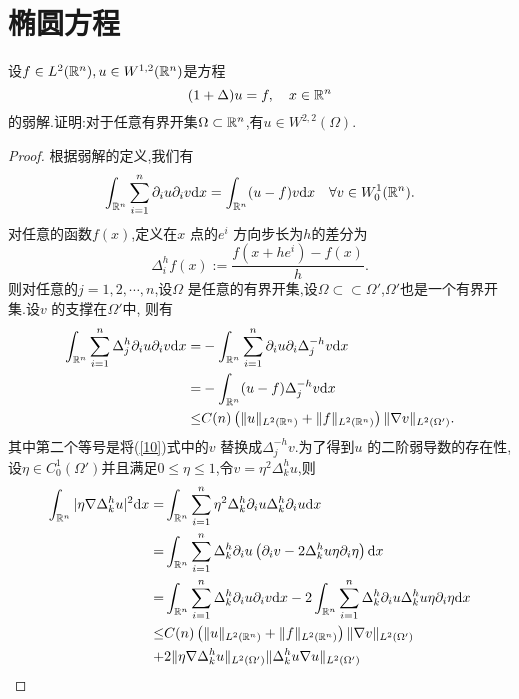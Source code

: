 \section{椭圆方程}
\begin{exercise}
  设$f\in  L^2(\mathbb{R}^{n}),u\in W^{1,2}(\mathbb{R}^{n})$是方程
  \[
    (1+\Delta)u=f,\quad x\in \mathbb{R}^{n}
  \] 
  的弱解.证明:对于任意有界开集$\Omega \subset \mathbb{R}^{n}$,有$u\in W^{2,2}(\Omega)$.
\end{exercise}
\begin{proof}
  根据弱解的定义,我们有
  \begin{equation}\label{10}
    \int_{\mathbb{R}^{n}}\sum_{i=1}^{n} \partial_i u \partial_i v\mathrm{d}x=\int_{\mathbb{R}^{n}}(u-f)v\mathrm{d}x\quad\forall v\in W_0^{1}(\mathbb{R}^{n}).
  \end{equation}
  对任意的函数$f(x)$,定义在$x$ 点的$e^{i}$ 方向步长为$h$的差分为
   \[
     \Delta_i^{h}f(x):= \frac{f(x+he^{i})-f(x)}{h}.
  \]
  则对任意的$j=1,2,\cdots,n$,设$\Omega$ 是任意的有界开集,设$\Omega \subset  \subset  \Omega'$,$\Omega'$也是一个有界开集.设$v$ 的支撑在$\Omega'$中, 则有
  \begin{align*}
    \int_{\mathbb{R}^{n}}\sum_{i=1}^{n} \Delta_j^{h}\partial_i u\partial_iv\mathrm{d}x=& -\int_{\mathbb{R}^{n}}\sum_{i=1}^{n} \partial_i u \partial_i \Delta^{-h}_j v \mathrm{d}x\\
    =& -\int_{\mathbb{R}^{n}}(u-f)\Delta^{-h}_j v\mathrm{d}x\\
    \le & C(n) \left( \|u\|_{L^2(\mathbb{R}^{n})} + \|f\|_{L^2(\mathbb{R}^{n})} \right) \|\nabla v\|_{L^2(\Omega')}
  .\end{align*}
  其中第二个等号是将(\ref{10})式中的$v$ 替换成$\Delta^{-h}_j v$.为了得到$u$ 的二阶弱导数的存在性,设$\eta \in C_0^{1}(\Omega')$并且满足$0\le \eta\le 1$,令$v=\eta^2 \Delta_k^{h}u$,则
  \begin{align*}
    \int_{\R^{n}}| \eta \nabla \Delta_k^{h}u|^2\mathrm{d}x
      = & \int_{\R^{n}}\sum_{i=1}^{n} \eta^2 \Delta_k^{h} \partial_i u \Delta_k^{h}\partial_iu\mathrm{d}x\\
      = & \int_{\R^{n}}\sum_{i=1}^{n}  \Delta^{h}_k \partial_i u \left( \partial_i v-2 \Delta^{h}_k u \eta \partial_i \eta \right) \mathrm{d}x\\
     = & \int_{\R^{n}}\sum_{i=1}^{n} \Delta_k^{h}\partial_i u \partial_iv \mathrm{d}x-2\int_{\R^{n}}\sum_{i=1}^{n} \Delta_k^{h}\partial_i u \Delta_k^{h}u \eta \partial_i\eta \mathrm{d}x\\
     \le & C(n)\left( \|u\|_{L^2(\R^{n})}+\|f\|_{L^2(\R^{n})} \right) \|\nabla v\|_{L^2(\Omega')}\\
     + & 2\|\eta \nabla  \Delta^{h}_k u\|_{L^2(\Omega')}\|\Delta^{h}_k u \nabla u\|_{L^2(\Omega')}

\end{align*}
\end{proof}
